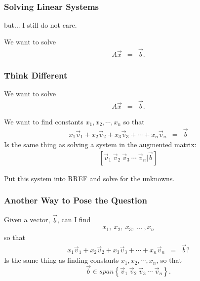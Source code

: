 \begin{frame}
  \frametitle{Solving Linear Systems}

  but... I still do not care.

  We want to solve
  \begin{eqnarray*}
    A \vec{x} & = & \vec{b}.
  \end{eqnarray*}



\end{frame}

\begin{frame}
  \frametitle{Think Different}

  We want to solve
  \begin{eqnarray*}
    A \vec{x} & = & \vec{b}.
  \end{eqnarray*}

    We want to find constants $x_1, x_2, \cdots, x_n$ so that
    \begin{eqnarray*}
      x_1 \vec{v}_1 + x_2 \vec{v}_2 + x_3 \vec{v}_3 + \cdots + x_n \vec{v}_n & = & \vec{b}
    \end{eqnarray*}
    Is the same thing as solving a system in the augmented matrix:
    \begin{eqnarray*}
      \left[ \vec{v}_1 ~ \vec{v}_2 ~ \vec{v}_3 ~ \cdots ~ \vec{v}_n \bigg| \vec{b} \right]
    \end{eqnarray*}

    Put this system into RREF and solve for the unknowns.


\end{frame}


\begin{frame}
  \frametitle{Another Way to Pose the Question}

  Given a vector, $\vec{b}$, can I find 
  \begin{eqnarray*}
    x_1,~x_2,~x_3,~\ldots~,x_n
  \end{eqnarray*}
  so that 
  \begin{eqnarray*}
    x_1 \vec{v}_1 + x_2 \vec{v}_2 + x_3 \vec{v}_3 + \cdots + x_n \vec{v}_n & = & \vec{b}?
  \end{eqnarray*}
  Is the same thing as finding constants $x_1, x_2, \cdots, x_n$, so that 
   $$\vec{b} \in  span
   \left\{\vec{v}_1 ~ \vec{v}_2 ~ \vec{v}_3 ~ \cdots ~ \vec{v}_n \right\}.
   $$

\end{frame}


